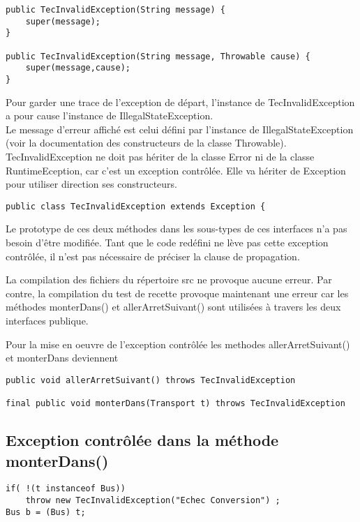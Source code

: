 \documentclass[12pt,a4paper]{article}
\begin{document}
\begin{verbatim}
public TecInvalidException(String message) {
	super(message);
}

public TecInvalidException(String message, Throwable cause) {
	super(message,cause);
}
\end{verbatim}

Pour garder une trace de l’exception de départ, l’instance de TecInvalidException a pour cause l’instance de IllegalStateException. \\
Le message d’erreur affiché est celui défini par l’instance de IllegalStateException (voir la documentation des constructeurs de la classe Throwable). \\

TecInvalidException ne doit pas hériter de la classe Error ni de la classe RuntimeEception, car c'est un exception contrôlée. Elle va hériter de Exception pour utiliser direction ses constructeurs.\\ 

\begin{verbatim}
public class TecInvalidException extends Exception {
\end{verbatim}

Le prototype de ces deux méthodes dans les sous-types de ces interfaces n’a pas besoin d’être modifiée. Tant que le code redéfini ne lève pas cette exception contrôlée, il n’est pas nécessaire de préciser la clause de propagation.

La compilation des fichiers du répertoire src ne provoque aucune erreur. Par contre, la compilation du test de recette provoque maintenant une erreur car les méthodes monterDans() et allerArretSuivant() sont utilisées à travers les deux interfaces publique.

Pour la mise en oeuvre de l'exception contrôlée les methodes allerArretSuivant() et monterDans deviennent 
\begin{verbatim}
public void allerArretSuivant() throws TecInvalidException 

final public void monterDans(Transport t) throws TecInvalidException 
\end{verbatim}

\newpage
\subsection{Exception contrôlée dans la méthode monterDans()}

\begin{verbatim}
if( !(t instanceof Bus))
	throw new TecInvalidException("Echec Conversion") ;
Bus b = (Bus) t;
\end{verbatim}
\end{document}
